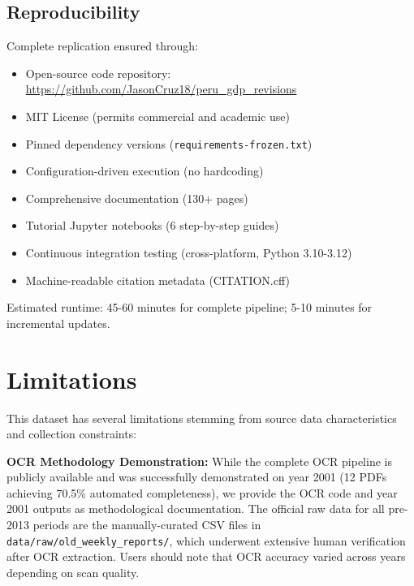 \documentclass[12pt]{article}
\begin{document}
\subsection*{Reproducibility}

Complete replication ensured through:
\begin{itemize}
\item Open-source code repository: \url{https://github.com/JasonCruz18/peru_gdp_revisions}
\item MIT License (permits commercial and academic use)
\item Pinned dependency versions (\texttt{requirements-frozen.txt})
\item Configuration-driven execution (no hardcoding)
\item Comprehensive documentation (130+ pages)
\item Tutorial Jupyter notebooks (6 step-by-step guides)
\item Continuous integration testing (cross-platform, Python 3.10-3.12)
\item Machine-readable citation metadata (CITATION.cff)
\end{itemize}

Estimated runtime: 45-60 minutes for complete pipeline; 5-10 minutes for incremental updates.

\section*{Limitations}


This dataset has several limitations stemming from source data characteristics and collection constraints:

\textbf{OCR Methodology Demonstration:} While the complete OCR pipeline is publicly available and was successfully demonstrated on year 2001 (12 PDFs achieving 70.5\% automated completeness), we provide the OCR code and year 2001 outputs as methodological documentation. The official raw data for all pre-2013 periods are the manually-curated CSV files in \texttt{data/raw/old\_weekly\_reports/}, which underwent extensive human verification after OCR extraction. Users should note that OCR accuracy varied across years depending on scan quality.
\end{document}
